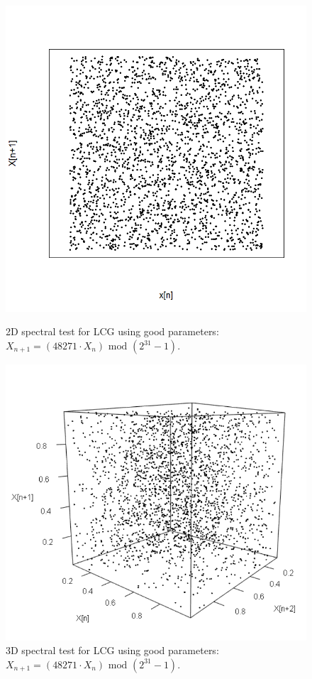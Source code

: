 \begin{figure}
	\centering
	\begin{minipage}{0.45\textwidth}
		\centering
		\includegraphics[width=\linewidth]{billder/spec_good_lcg_2d.png}
		\caption{2D spectral test for LCG using good parameters: $X_{n+1}=(48271\cdot X_{n}) \text{ mod } (2^{31}-1)$.}
		\label{fig:goodspec2d}
	\end{minipage}\hfill
	\begin{minipage}{0.45\textwidth}
		\centering
		\includegraphics[width=\linewidth]{billder/spec_good_lcg_3d.png}
		\caption{3D spectral test for LCG using good parameters: $X_{n+1}=(48271\cdot X_{n}) \text{ mod } (2^{31}-1)$.}
		\label{fig:goodspec3d}
	\end{minipage}
\end{figure}

